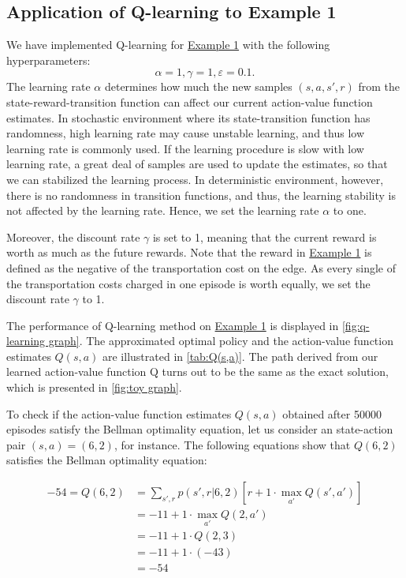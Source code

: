 \subsection{Application of Q-learning to Example 1}
We have implemented Q-learning for \hyperref[fig:toy graph]{Example 1} with the following hyperparameters:
$$\alpha = 1, \gamma = 1, \varepsilon = 0.1.$$
The learning rate $\alpha$ determines how much the new samples  $(s,a,s',r)$ from the state-reward-transition function can affect our current action-value function estimates. In stochastic environment where its state-transition function has randomness, high learning rate may cause unstable learning, and thus low learning rate is commonly used. If the learning procedure is slow with low learning rate, a great deal of samples are used to update the estimates, so that we can stabilized the learning process. In deterministic environment, however, there is no randomness in transition functions, and thus, the learning stability is not affected by the learning rate. Hence, we set the learning rate $\alpha$ to one.

Moreover, the discount rate $\gamma$ is set to 1, meaning that the current reward is worth as much as the future rewards. Note that the reward in \hyperref[fig:toy graph]{Example 1} is defined as the negative of the transportation cost on the edge. As every single of the transportation costs charged in one episode is worth equally, we set the discount rate $\gamma$ to 1.

The performance of Q-learning method on \hyperref[fig:toy graph]{Example 1} is displayed in \autoref{fig:q-learning graph}. The approximated optimal policy and the action-value function estimates $Q(s,a)$ are illustrated in \autoref{tab:Q(s,a)}. The path derived from our learned action-value function Q turns out to be the same as the exact solution, which is presented in \autoref{fig:toy graph}.

To check if the action-value function estimates $Q(s,a)$ obtained after 50000 episodes satisfy the Bellman optimality equation, let us consider an state-action pair $(s,a) = (6,2)$, for instance. The following equations show that $Q(6,2)$ satisfies the Bellman optimality equation:

\begin{align*}
    -54 = Q(6,2) &= \sum_{s',r}p(s',r | 6,2)[r + 1\cdot \max_{a'} Q(s',a')]\\
    &= -11 + 1 \cdot \max_{a'} Q(2,a')\\
    &= -11 + 1 \cdot Q(2,3)\\
    &= -11 + 1 \cdot (-43)\\
    &= -54
\end{align*}

